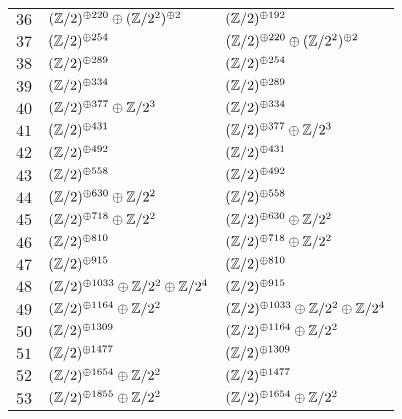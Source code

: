 \begin{supertabular}{|c|p{5.5cm}|p{5.5cm}|}
$36$%
&$(\mathbb{Z}/2)^{\oplus220}\oplus(\mathbb{Z}/2^{2})^{\oplus2}$%
&$(\mathbb{Z}/2)^{\oplus192}$\\

$37$%
&$(\mathbb{Z}/2)^{\oplus254}$%
&$(\mathbb{Z}/2)^{\oplus220}\oplus(\mathbb{Z}/2^{2})^{\oplus2}$\\

$38$%
&$(\mathbb{Z}/2)^{\oplus289}$%
&$(\mathbb{Z}/2)^{\oplus254}$\\

$39$%
&$(\mathbb{Z}/2)^{\oplus334}$%
&$(\mathbb{Z}/2)^{\oplus289}$\\

$40$%
&$(\mathbb{Z}/2)^{\oplus377}\oplus\mathbb{Z}/2^{3}$%
&$(\mathbb{Z}/2)^{\oplus334}$\\

$41$%
&$(\mathbb{Z}/2)^{\oplus431}$%
&$(\mathbb{Z}/2)^{\oplus377}\oplus\mathbb{Z}/2^{3}$\\

$42$%
&$(\mathbb{Z}/2)^{\oplus492}$%
&$(\mathbb{Z}/2)^{\oplus431}$\\

$43$%
&$(\mathbb{Z}/2)^{\oplus558}$%
&$(\mathbb{Z}/2)^{\oplus492}$\\

$44$%
&$(\mathbb{Z}/2)^{\oplus630}\oplus\mathbb{Z}/2^{2}$%
&$(\mathbb{Z}/2)^{\oplus558}$\\

$45$%
&$(\mathbb{Z}/2)^{\oplus718}\oplus\mathbb{Z}/2^{2}$%
&$(\mathbb{Z}/2)^{\oplus630}\oplus\mathbb{Z}/2^{2}$\\

$46$%
&$(\mathbb{Z}/2)^{\oplus810}$%
&$(\mathbb{Z}/2)^{\oplus718}\oplus\mathbb{Z}/2^{2}$\\

$47$%
&$(\mathbb{Z}/2)^{\oplus915}$%
&$(\mathbb{Z}/2)^{\oplus810}$\\

$48$%
&$(\mathbb{Z}/2)^{\oplus1033}\oplus\mathbb{Z}/2^{2}\oplus\mathbb{Z}/2^{4}$%
&$(\mathbb{Z}/2)^{\oplus915}$\\

$49$%
&$(\mathbb{Z}/2)^{\oplus1164}\oplus\mathbb{Z}/2^{2}$%
&$(\mathbb{Z}/2)^{\oplus1033}\oplus\mathbb{Z}/2^{2}\oplus\mathbb{Z}/2^{4}$\\

$50$%
&$(\mathbb{Z}/2)^{\oplus1309}$%
&$(\mathbb{Z}/2)^{\oplus1164}\oplus\mathbb{Z}/2^{2}$\\

$51$%
&$(\mathbb{Z}/2)^{\oplus1477}$%
&$(\mathbb{Z}/2)^{\oplus1309}$\\

$52$%
&$(\mathbb{Z}/2)^{\oplus1654}\oplus\mathbb{Z}/2^{2}$%
&$(\mathbb{Z}/2)^{\oplus1477}$\\

$53$%
&$(\mathbb{Z}/2)^{\oplus1855}\oplus\mathbb{Z}/2^{2}$%
&$(\mathbb{Z}/2)^{\oplus1654}\oplus\mathbb{Z}/2^{2}$\\


\end{supertabular}
